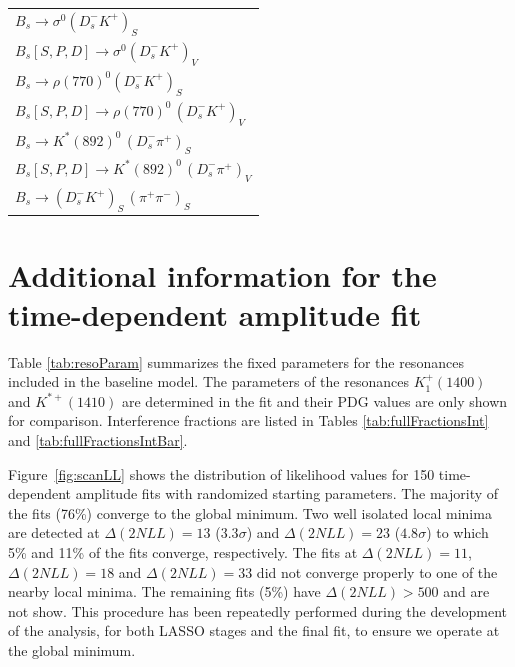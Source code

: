 \begin{table}[h]
\begin{tabular} {@{\hspace{0.5cm}}l@{\hspace{0.25cm}}}
              $B_s \to \sigma^{0} (D_s^- K^+)_S$ \\
              $B_s[S,P,D] \to \sigma^{0} (D_s^- K^+)_V$ \\
              $B_s \to \rho(770)^{0} (D_s^- K^+)_S$ \\
              $B_s[S,P,D] \to \rho(770)^{0} \, (D_s^- K^+)_V$\\
              $B_s \to  K^{*}(892)^{0} \, (D_s^- \pi^+)_S$ \\
              $B_s[S,P,D]  \to  K^{*}(892)^{0} \, (D_s^- \pi^+)_V$ \\
              $B_s \to (D_s^- K^+)_{S} \, (\pi^+ \pi^-)_{S}$ \\
              \hline \hline
           \end{tabular}
\end{table}


\clearpage


\section{Additional information for the time-dependent amplitude fit}
\label{a:ResoParas}

\setcounter{figure}{0}
\setcounter{table}{0}
\renewcommand{\thefigure}{K.\arabic{figure}}
\renewcommand{\thetable}{K.\arabic{table}}


Table \ref{tab:resoParam} summarizes the fixed parameters for the resonances included in the baseline model.
The parameters of the resonances $K^{+}_{1}(1400)$ and $K^{*+}(1410)$ are determined in the fit 
and their PDG values are only shown for comparison.
Interference fractions are listed in Tables \ref{tab:fullFractionsInt} and \ref{tab:fullFractionsIntBar}.

Figure~\ref{fig:scanLL} shows the distribution of likelihood values 
for 150 time-dependent amplitude fits with randomized starting parameters.
The majority of the fits (76\%) converge to the global minimum.
Two well isolated local minima are detected 
at $\Delta(2NLL) = 13$ ($3.3\sigma$)
and $\Delta(2NLL) = 23$ ($4.8\sigma$)
to which 5\% and 11\%
of the fits converge, respectively.
The fits at $\Delta(2NLL) = 11$, $\Delta(2NLL) = 18$ and $\Delta(2NLL) = 33$ did not converge properly to one of the nearby local minima. 
The remaining fits (5\%) have $\Delta(2NLL) > 500$ and are not show.
This procedure has been repeatedly performed during the development of the analysis, for both LASSO stages and the final fit,
to ensure we operate at the global minimum. 



